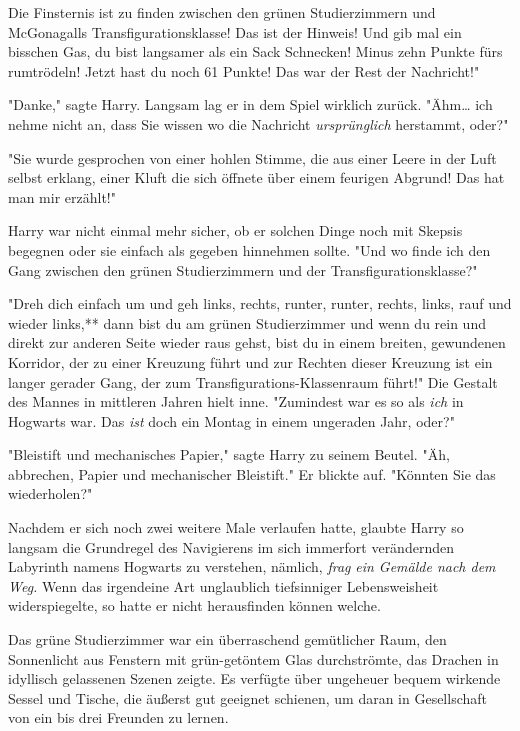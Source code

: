 {Die Finsternis ist zu finden zwischen den grünen Studierzimmern und McGonagalls Transfigurationsklasse! Das ist der Hinweis! Und gib mal ein bisschen Gas, du bist langsamer als ein Sack Schnecken! Minus zehn Punkte fürs rumtrödeln! Jetzt hast du noch 61 Punkte! Das war der Rest der Nachricht!"

"Danke," sagte Harry. Langsam lag er in dem Spiel wirklich zurück. "Ähm… ich nehme nicht an, dass Sie wissen wo die Nachricht \emph{ursprünglich} herstammt, oder?"

"Sie wurde gesprochen von einer hohlen Stimme, die aus einer Leere in der Luft selbst erklang, einer Kluft die sich öffnete über einem feurigen Abgrund! Das hat man mir erzählt!"

Harry war nicht einmal mehr sicher, ob er solchen Dinge noch mit Skepsis begegnen oder sie einfach als gegeben hinnehmen sollte. "Und wo finde ich den Gang zwischen den grünen Studierzimmern und der Transfigurationsklasse?"

"Dreh dich einfach um und geh links, rechts, runter, runter, rechts, links, rauf und wieder links,** dann bist du am grünen Studierzimmer und wenn du rein und direkt zur anderen Seite wieder raus gehst, bist du in einem breiten, gewundenen Korridor, der zu einer Kreuzung führt und zur Rechten dieser Kreuzung ist ein langer gerader Gang, der zum Transfigurations-Klassenraum führt!" Die Gestalt des Mannes in mittleren Jahren hielt inne. "Zumindest war es so als \emph{ich} in Hogwarts war. Das \emph{ist} doch ein Montag in einem ungeraden Jahr, oder?"

"Bleistift und mechanisches Papier," sagte Harry zu seinem Beutel. "Äh, abbrechen, Papier und mechanischer Bleistift." Er blickte auf. "Könnten Sie das wiederholen?"

Nachdem er sich noch zwei weitere Male verlaufen hatte, glaubte Harry so langsam die Grundregel des Navigierens im sich immerfort verändernden Labyrinth namens Hogwarts zu verstehen, nämlich, \emph{frag} \emph{ein Gemälde nach dem Weg.} Wenn das irgendeine Art unglaublich tiefsinniger Lebensweisheit widerspiegelte, so hatte er nicht herausfinden können welche.

Das grüne Studierzimmer war ein überraschend gemütlicher Raum, den Sonnenlicht aus Fenstern mit grün-getöntem Glas durchströmte, das Drachen in idyllisch gelassenen Szenen zeigte. Es verfügte über ungeheuer bequem wirkende Sessel und Tische, die äußerst gut geeignet schienen, um daran in Gesellschaft von ein bis drei Freunden zu lernen.

}

